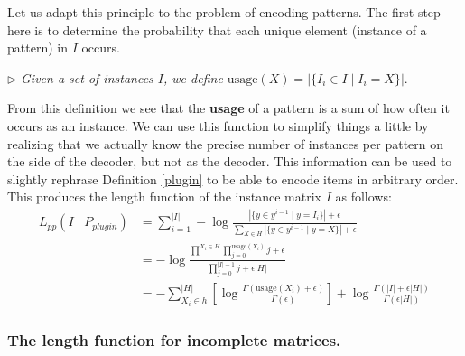 \documentclass{llncs}
\begin{document}
Let us adapt this principle to the problem of encoding patterns. The first step here is to determine the probability that each unique element (instance of a pattern) in ${I}$ occurs. 

\label{usage}
\smallskip \noindent $\triangleright$
\emph{Given a set of instances ${I}$, we define $\mathrm{usage}(X) = |\{ {I}_i \in {I} \mid {I}_i = X\}|.$}
\smallskip

From this definition we see that the \textbf{usage} of a pattern is a sum of how often it occurs as an instance. We can use this function to simplify things a little by realizing that we actually know the precise number of instances per pattern on the side of the decoder, but not as the decoder. This information can be used to slightly rephrase Definition \ref{plugin} to be able to encode items in arbitrary order. This produces the length function of the instance matrix ${I}$ as follows:
\begin{align*}
	L_{pp}({I}\mid P_{plugin}) &= \sum^{|{I}|}_{i=1} -\log \frac{|\{y \in y^{i-1} \mid y = {I}_i\}| + \epsilon }{\sum_{X \in H}|\{y \in y^{i-1} \mid y = X\}| + \epsilon}\\
	&= -\log \frac{\prod^{X_i\in H} \prod^{\mathrm{usage}(X_i)}_{j=0} j + \epsilon}{\prod^{|{I}|-1}_{j=0} j + \epsilon|H|} \\
	&= -\sum^{|H|}_{X_i \in h} \left[ \log \frac{\Gamma(\mathrm{usage}(X_i)+\epsilon)}{\Gamma(\epsilon)}\right] + \log \frac{\Gamma(|{I}| + \epsilon|H|)}{\Gamma(\epsilon|H|)}
\end{align*}


\subsubsection{The length function for incomplete matrices.}
\end{document}
